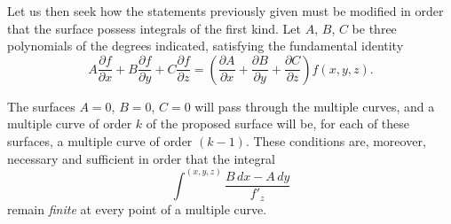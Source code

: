 \documentclass{article}
\begin{document}
Let us then seek how the statements previously given must be modified in order that the surface possess integrals of the first kind. Let $A$, $B$, $C$ be three polynomials of the degrees indicated, satisfying
the fundamental identity
\[
A \frac{\partial f}{\partial x} + B \frac{\partial f}{\partial y} + C \frac{\partial f}{\partial z} = \left( \frac{\partial A}{\partial x} + \frac{\partial B}{\partial y} + \frac{\partial C}{\partial z} \right) f(x, y, z).
\]

The surfaces $A = 0$, $B = 0$, $C = 0$ will pass through the multiple curves, and a multiple curve of order $k$ of the proposed surface will be, for each of these surfaces, a multiple curve of order $(k - 1)$. These conditions are, moreover, necessary and sufficient in order that the integral
\[
\int^{(x, y, z)} \frac{B\,dx - A\,dy}{f'_{z}}
\]
remain \emph{finite} at every point of a multiple curve.
\end{document}

